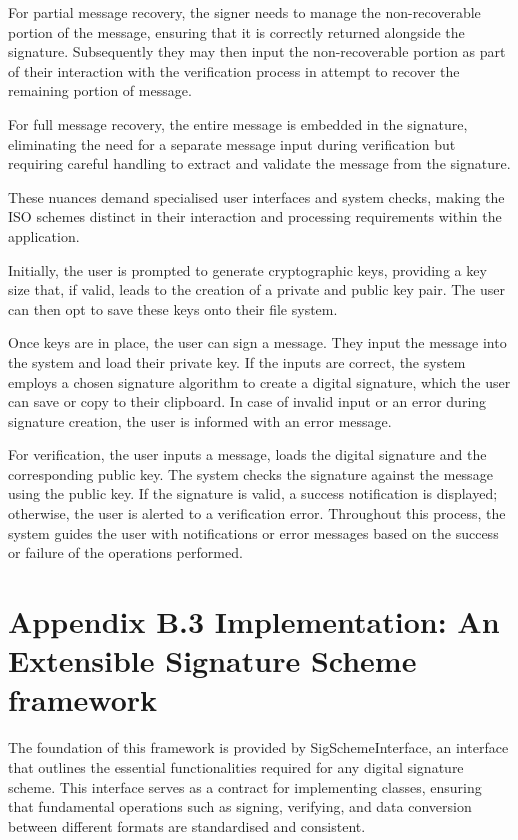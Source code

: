 \documentclass[]{final_report}
\theoremstyle{definition}
\begin{document}
For partial message recovery, the signer needs to manage the non-recoverable portion of the message, ensuring that it is correctly returned alongside the signature. Subsequently they may then input the non-recoverable portion as part of their interaction with the verification process in attempt to recover the remaining portion of message. 

For full message recovery, the entire message is embedded in the signature, eliminating the need for a separate message input during verification but requiring careful handling to extract and validate the message from the signature. 

These nuances demand specialised user interfaces and system checks, making the ISO schemes distinct in their interaction and processing requirements within the application.

Initially, the user is prompted to generate cryptographic keys, providing a key size that, if valid, leads to the creation of a private and public key pair. The user can then opt to save these keys onto their file system.

Once keys are in place, the user can sign a message. They input the message into the system and load their private key. If the inputs are correct, the system employs a chosen signature algorithm to create a digital signature, which the user can save or copy to their clipboard. In case of invalid input or an error during signature creation, the user is informed with an error message.

For verification, the user inputs a message, loads the digital signature and the corresponding public key. The system checks the signature against the message using the public key. If the signature is valid, a success notification is displayed; otherwise, the user is alerted to a verification error. Throughout this process, the system guides the user with notifications or error messages based on the success or failure of the operations performed.




\section{Appendix B.3 Implementation: An Extensible Signature Scheme framework}
The foundation of this framework is provided by SigSchemeInterface, an interface that outlines the essential functionalities required for any digital signature scheme. This interface serves as a contract for implementing classes, ensuring that fundamental operations such as signing, verifying, and data conversion between different formats are standardised and consistent.
\end{document}
